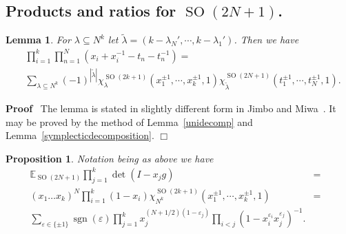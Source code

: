 \documentclass[11pt]{amsart}
\newcommand{\tmop}[1]{\ensuremath{\operatorname{#1}}}
\newtheorem{proposition}{Proposition}
\renewenvironment{proof}{
\noindent\textbf{Proof}\ }{\hspace*{\fill}
\begin{math}\Box\end{math}\medskip}
\newtheorem{lemma}{Lemma}
\begin{document}
\subsection{Products and ratios for $\tmop{SO} ( 2 N + 1 )$.}

\begin{lemma} \label{lem:sod}
  For $\lambda \subseteq N^k$ let
  $\tilde{\lambda} = ( k - \lambda_N', \cdots, k- \lambda_1' )$. Then we have
  \begin{equation}\label{e:cfsod1}
  \begin{aligned}
&    \prod_{i = 1}^k \prod_{n = 1}^N ( x_i + x_i^{- 1} - t_n -
t_n^{- 1} )  = \\
&    \sum_{\lambda \subseteq N^k} ( - 1 )^{| \tilde{\lambda} |}
    \chi_{\lambda}^{\tmop{SO} ( 2 k + 1 )} ( x_1^{\pm 1}, \cdots, x_k^{\pm 1},
    1 ) \chi_{\tilde{\lambda}}^{\tmop{SO} ( 2 N + 1 )} ( t_1^{\pm 1}, \cdots,
    t_N^{\pm 1}, 1 ) .
\end{aligned}
\end{equation}
\end{lemma}

\begin{proof}
  The lemma is stated in slightly different form in Jimbo and
  Miwa~{\cite{JM}}. It may be proved by the method of  Lemma~\ref{unidecomp}
  and
  Lemma~\ref{symplecticdecomposition}.
\end{proof}

\begin{proposition}
  \label{prop:sod}Notation being as above we have
  \begin{eqnarray}
    \mathbb{E}_{\tmop{SO} ( 2 N + 1 )} \prod_{j = 1}^k \det ( I - x_j g ) & =
    &  \nonumber\\
    ( x_1 \ldots x_k )^N \prod_{i = 1}^k ( 1 - x_i ) \chi_{N^k}^{\tmop{SO} ( 2
    k + 1 )} ( x_1^{\pm 1}, \cdots, x_k^{\pm 1}, 1 ) & = &  \nonumber\\
    \sum_{\varepsilon \in \{ \pm 1 \}} \tmop{sgn} ( \varepsilon ) \prod_{j =
    1}^k x_j^{( N + 1 / 2 ) ( 1 - \varepsilon_j )} \prod_{i < j} ( 1 -
    x_i^{\varepsilon_i} x_j^{\varepsilon_j} )^{- 1} . &  &  \label{e:sod}
  \end{eqnarray}
\end{proposition}
\end{document}
